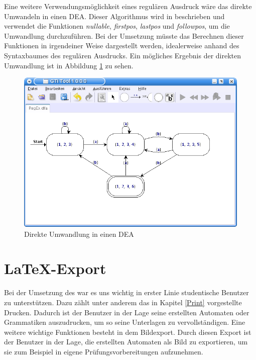 Eine weitere Verwendungsmöglichkeit eines regulären Ausdruck wäre das direkte
Umwandeln in einen DEA. Dieser Algorithmus wird in
\cite[S. 175ff]{Compilers} beschrieben und verwendet die Funktionen
\textit{nullable}, \textit{firstpos}, \textit{lastpos} und \textit{followpos},
um die Umwandlung durchzuführen. Bei der Umsetzung müsste das Berechnen dieser
Funktionen in irgendeiner Weise dargestellt werden, idealerweise anhand des
Syntaxbaumes des regulären Ausdrucks. Ein mögliches Ergebnis der direkten
Umwandlung ist in Abbildung \ref{FigureRegExDFA} zu sehen.\vspace{10pt}

\begin{figure}[h!]
\begin{center}
\includegraphics[width=12cm]{../images/regex_dfa.png}
\caption{Direkte Umwandlung in einen DEA}
\label{FigureRegExDFA}
\end{center}
\end{figure}
\vspace{10pt}


\section{\LaTeX-Export}

Bei der Umsetzung des \gtitools war es uns wichtig in erster Linie studentische
Benutzer zu unterstützen. Dazu zählt unter anderem das in Kapitel \ref{Print}
vorgestellte Drucken. Dadurch ist der Benutzer in der Lage seine erstellten
Automaten oder Grammatiken auszudrucken, um so seine Unterlagen zu
vervollständigen. Eine weitere wichtige Funktionen besteht in dem Bildexport.
Durch diesen Export ist der Benutzer in der Lage, die erstellten Automaten als
Bild zu exportieren, um sie zum Beispiel in eigene Prüfungsvorbereitungen
aufzunehmen.\vspace{10pt}

